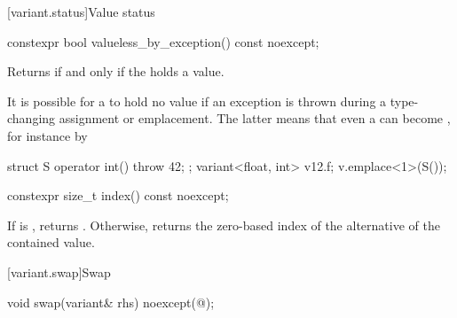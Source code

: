 [variant.status]{Value status}

%
\begin{itemdecl}
constexpr bool valueless_by_exception() const noexcept;
\end{itemdecl}

\begin{itemdescr}
\pnum
\effects
Returns  if and only if the  holds a value.

\pnum
\begin{note}
It is possible for a  to hold no value
if an exception is thrown during a
type-changing assignment or emplacement. The latter means that even a
 can become , for
instance by
\begin{codeblock}
struct S { operator int() { throw 42; }};
variant<float, int> v{12.f};
v.emplace<1>(S());
\end{codeblock}
\end{note}
\end{itemdescr}

%
\begin{itemdecl}
constexpr size_t index() const noexcept;
\end{itemdecl}

\begin{itemdescr}
\pnum
\effects
If  is , returns .
Otherwise, returns the zero-based index of the alternative of the contained value.
\end{itemdescr}

[variant.swap]{Swap}

%
\begin{itemdecl}
void swap(variant& rhs) noexcept(@\seebelow@);
\end{itemdecl}

